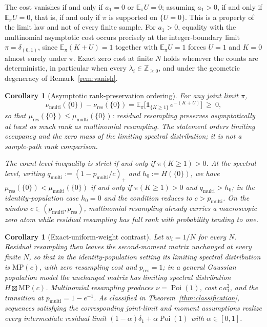 \documentclass[lettersize,journal]{IEEEtran}
\newtheorem{coro}[theo]{Corollary}
\theoremstyle{remark}
\begin{document}
The cost vanishes if and only if $a_1=0$ or $\mathbb{E}_\pi U=0$; assuming
$a_1>0$, if and only if $\mathbb{E}_\pi U=0$, that is, if and only if $\pi$ is
supported on $\{U=0\}$. This is a property of the limit law and not of every
finite sample. For $a_1>0$, equality with the multinomial asymptotic cost
occurs precisely at the integer-boundary limit $\pi=\delta_{(0,1)}$, since
$\mathbb{E}_\pi(K+U)=1$ together with $\mathbb{E}_\pi U=1$ forces $U=1$ and
$K=0$ almost surely under $\pi$. Exact zero cost at finite $N$ holds whenever
the counts are deterministic, in particular when every
$\lambda_i\in\mathbb{Z}_{\ge0}$, and under the geometric degeneracy of
Remark~\ref{rem:vanish}.

\begin{coro}[Asymptotic rank-preservation ordering]
\label{coro:rank-order}
For any joint limit $\pi$,
\begin{equation}
  \nu_{\mathrm{multi}}(\{0\})-\nu_{\mathrm{res}}(\{0\})
    = \mathbb{E}_\pi\big[\mathbf{1}_{\{K\ge1\}}\,e^{-(K+U)}\big]\ \ge\ 0,
  \label{eq:rank-order}
\end{equation}
so that $\mu_{\mathrm{res}}(\{0\})\le\mu_{\mathrm{multi}}(\{0\})$: residual
resampling preserves asymptotically at least as much rank as multinomial
resampling. The statement orders limiting occupancy and the zero mass of the
limiting spectral distribution; it is not a sample-path rank comparison.

The count-level inequality is strict if and only if $\pi(K\ge1)>0$. At the
spectral level, writing $q_{\mathrm{multi}}:=(1-p_{\mathrm{multi}}/c)_+$ and
$h_0:=H(\{0\})$, we have
$\mu_{\mathrm{res}}(\{0\})<\mu_{\mathrm{multi}}(\{0\})$ if and only if
$\pi(K\ge1)>0$ and $q_{\mathrm{multi}}>h_0$; in the identity-population case
$h_0=0$ and the condition reduces to $c>p_{\mathrm{multi}}$. On the window
$c\in(p_{\mathrm{multi}},p_{\mathrm{res}})$, multinomial resampling already
carries a macroscopic zero atom while residual resampling has full rank with
probability tending to one.
\end{coro}

\begin{coro}[Exact-uniform-weight contrast]
\label{coro:uniform-contrast}
Let $w_i=1/N$ for every $N$. Residual resampling then leaves the second-moment
matrix unchanged at every finite $N$, so that in the identity-population
setting its limiting spectral distribution is $\mathrm{MP}(c)$, with zero
resampling cost and $p_{\mathrm{res}}=1$; in a general Gaussian population
model the unchanged matrix has limiting spectral distribution
$H\boxtimes\mathrm{MP}(c)$. Multinomial resampling produces
$\nu=\operatorname{Poi}(1)$, cost $c\,a_1^2$, and the transition at
$p_{\mathrm{multi}}=1-e^{-1}$. As classified in
Theorem~\ref{thm:classification}, sequences satisfying the corresponding
joint-limit and moment assumptions realize every intermediate residual limit
$(1-\alpha)\delta_1+\alpha\operatorname{Poi}(1)$ with $\alpha\in[0,1]$.
\end{coro}
\end{document}
